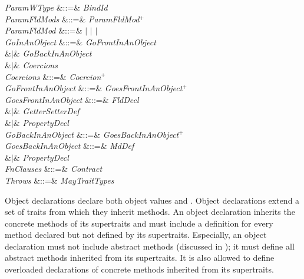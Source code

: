 \begin{Grammar}
\emph{ParamWType} &::=& \emph{BindId}  \\

\emph{ParamFldMods} &::=& \emph{ParamFldMod}$^+$\\

\emph{ParamFldMod} &::=& $|$  $|$  $|$ \\

\emph{GoInAnObject}
&::=& 
\emph{GoFrontInAnObject} \\
&$|$& 
\emph{GoBackInAnObject} \\
&$|$& \emph{Coercions}\\

\emph{Coercions} &::=& \emph{Coercion}$^+$\\

\emph{GoFrontInAnObject} &::=& \emph{GoesFrontInAnObject}$^+$\\

\emph{GoesFrontInAnObject}
&::=& \emph{FldDecl} \\
&$|$& \emph{GetterSetterDef} \\
&$|$& \emph{PropertyDecl} \\

\emph{GoBackInAnObject} &::=& \emph{GoesBackInAnObject}$^+$\\

\emph{GoesBackInAnObject}
&::=& \emph{MdDef} \\
&$|$& \emph{PropertyDecl} \\

\emph{FnClauses} &::=&  
\emph{Contract} \\

\emph{Throws} &::=&  \emph{MayTraitTypes}\\

\end{Grammar}

Object declarations declare both object values and \objecttypes.
Object declarations extend a
set of traits from which they inherit methods.
An object declaration inherits the
concrete methods of its supertraits and must include a definition for every
method declared but not defined by its supertraits.
Especially, an object declaration must not include abstract methods
(discussed in );
it must define all abstract methods inherited from its supertraits.
It is also allowed to define overloaded declarations of concrete methods
inherited from its supertraits.



